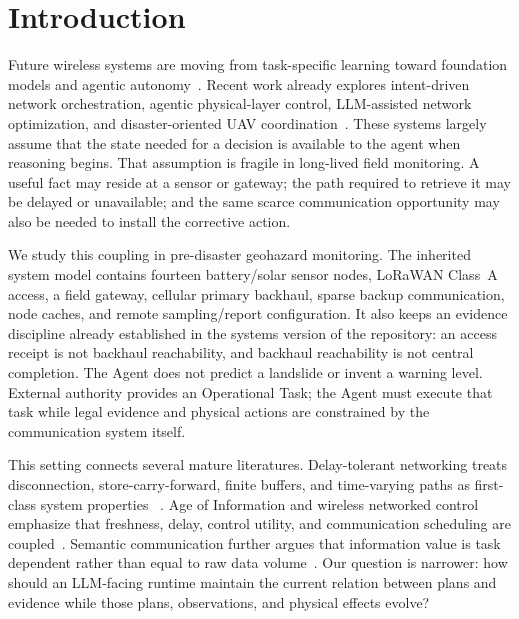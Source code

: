 \documentclass[journal,10pt]{IEEEtran}
\begin{document}
\section{Introduction}
Future wireless systems are moving from task-specific learning toward foundation models and
agentic autonomy~\cite{liang2025llmwireless,sheng2025wirelessfm,jiang2026largemodelsurvey,lu2026agenticgnn}.
Recent work already explores intent-driven network orchestration, agentic physical-layer control,
LLM-assisted network optimization, and disaster-oriented UAV coordination~\cite{jiang2026agenticibn,li2026agenticwireless,topollm,xu2025uavllm,sharma2024uavmarl}.
These systems largely assume that the state needed for a decision is available to the agent when
reasoning begins. That assumption is fragile in long-lived field monitoring. A useful fact may
reside at a sensor or gateway; the path required to retrieve it may be delayed or unavailable; and
the same scarce communication opportunity may also be needed to install the corrective action.

We study this coupling in pre-disaster geohazard monitoring. The inherited system model contains
fourteen battery/solar sensor nodes, LoRaWAN Class~A access, a field gateway, cellular primary
backhaul, sparse backup communication, node caches, and remote sampling/report configuration. It
also keeps an evidence discipline already established in the systems version of the repository:
an access receipt is not backhaul reachability, and backhaul reachability is not central
completion. The Agent does not predict a landslide or invent a warning level. External authority
provides an Operational Task; the Agent must execute that task while legal evidence and physical
actions are constrained by the communication system itself.

This setting connects several mature literatures. Delay-tolerant networking treats disconnection,
store-carry-forward, finite buffers, and time-varying paths as first-class system properties
~\cite{fall2003dtn,jain2004dtnrouting,dtnarch,rfc5050,rfc9171,iranmaneshdtnqueue}. Age of
Information and wireless networked control emphasize that freshness, delay, control utility, and
communication scheduling are coupled~\cite{kaul2012aoi,yates2021aoisurvey,bacinoglu1905,wang2021voi,park2018wncs}.
Semantic communication further argues that information value is task dependent rather than equal
to raw data volume~\cite{uysal2021semantic,guo2025semcomnet,jiang2025worldmodelsemcom}.
Our question is narrower: how should an LLM-facing runtime maintain the current relation between
plans and evidence while those plans, observations, and physical effects evolve?
\end{document}
